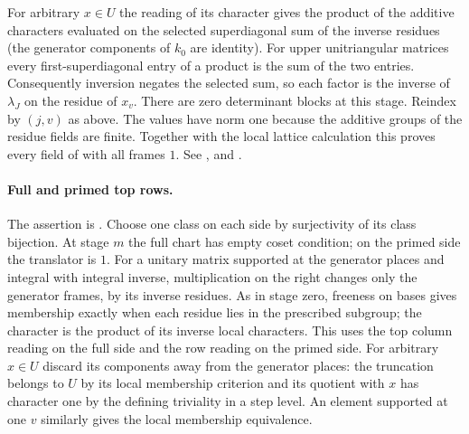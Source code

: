 For arbitrary $x\in U$ the reading of its character gives the product
of the additive characters evaluated on the selected superdiagonal sum
of the inverse residues (the generator components of $k_0$ are identity).
For upper unitriangular matrices every first-superdiagonal entry of a
product is the sum of the two entries. Consequently inversion negates
the selected sum, so each factor is the inverse of $\lambda_J$ on the
residue of $x_v$. There are zero determinant blocks at this stage.
Reindex by $(j,v)$ as above. The values have norm one because the
additive groups of the residue fields are finite. Together with the
local lattice calculation this proves every field of  with
all frames $1$. See ,
 and
.

\paragraph{Full and primed top rows.}
The assertion is .
Choose one class on each side by surjectivity of its class bijection.
At stage $m$ the full chart has empty coset condition; on the primed side
the translator is $1$. For a unitary matrix supported at the generator
places and integral with integral inverse, multiplication on the right
changes only the generator frames, by its inverse residues. As in stage
zero, freeness on bases gives membership exactly when each residue lies
in the prescribed subgroup; the character is the product of its inverse
local characters. This uses the top column reading on the full side and
the row reading on the primed side. For arbitrary $x\in U$ discard its
components away from the generator places: the truncation belongs to $U$
by its local membership criterion and its quotient with $x$ has character
one by the defining triviality in a step level. An element supported at
one $v$ similarly gives the local membership equivalence.


